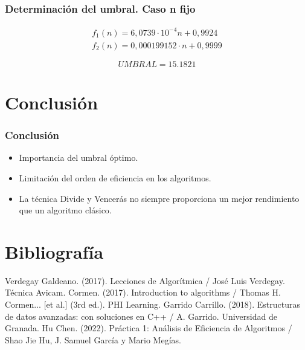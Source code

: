 \documentclass[13pt]{beamer}
\begin{document}
    \begin{frame}
        \frametitle{Determinación del umbral. Caso n fijo}
        \begin{eqnarray}
            f_1(n) = 6,0739 \cdot 10 ^{-4}  n + 0,9924 \\
            f_2(n) = 0,000199152 \cdot n + 0,9999
        \end{eqnarray} 
        
        \begin{equation}
           \boxed{UMBRAL = 15.1821}
        \end{equation}
    \end{frame}
    

    \section{Conclusión}

    \begin{frame}
        \frametitle{Conclusión}
        \begin{itemize}
            \item Importancia del umbral óptimo.
            \item Limitación del orden de eficiencia en los algoritmos.
            \item La técnica Divide y Vencerás no siempre proporciona un mejor rendimiento que un algoritmo clásico. 
        \end{itemize}
    \end{frame}


    \section{Bibliografía}

    \begin{frame}
        \begin{thebibliography}{0}
             Verdegay Galdeano. (2017). Lecciones de Algorítmica / José Luis Verdegay. Técnica Avicam.
             Cormen. (2017). Introduction to algorithms / Thomas H. Cormen... [et al.] (3rd ed.). PHI Learning.
             Garrido Carrillo. (2018). Estructuras de datos avanzadas: con soluciones en C++ / A. Garrido. Universidad de Granada.        
             Hu Chen. (2022). Práctica 1: Análisis de Eficiencia de Algoritmos / Shao Jie Hu, J. Samuel García y Mario Megías.      
        \end{thebibliography}
    \end{frame}
\end{document}
